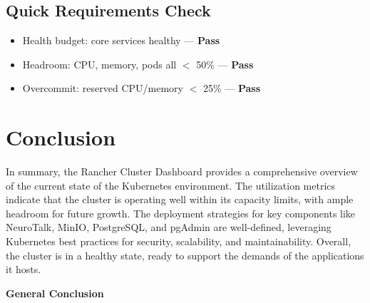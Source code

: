 \documentclass[a4paper,12pt]{report}
\begin{document}
\begin{doublespace}
\subsection*{Quick Requirements Check}
\begin{itemize}
  \item Health budget: core services healthy — \textbf{Pass}
  \item Headroom: CPU, memory, pods all $<$ 50\% — \textbf{Pass}
  \item Overcommit: reserved CPU/memory $<$ 25\% — \textbf{Pass}
\end{itemize}

\section{Conclusion}
\hspace{1cm}In summary, the Rancher Cluster Dashboard provides a comprehensive overview of the current state of the Kubernetes environment. The utilization metrics indicate that the cluster is operating well within its capacity limits, with ample headroom for future growth. The deployment strategies for key components like NeuroTalk, MinIO, PostgreSQL, and pgAdmin are well-defined, leveraging Kubernetes best practices for security, scalability, and maintainability. Overall, the cluster is in a healthy state, ready to support the demands of the applications it hosts.
\end{doublespace}


{}
\begin{center}
\vspace{9cm}
    \textbf{\huge{General Conclusion}}
\end{center}

\renewcommand{\headrulewidth}{1pt}
\fancyhead[L]{\hspace*{4cm}}
\end{document}
